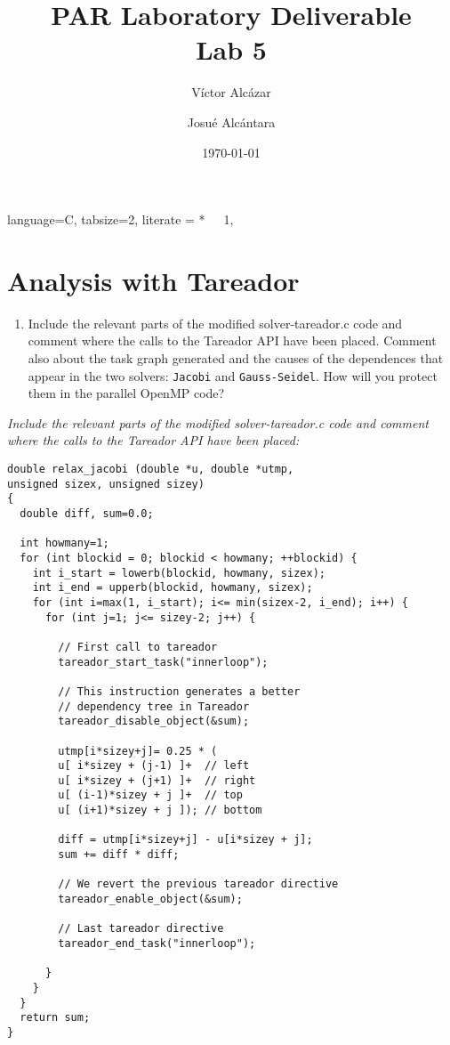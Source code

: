 \documentclass{report}
\author{Víctor Alcázar \and Josué Alcántara}
\title{PAR Laboratory Deliverable \\ Lab 5}
\date{\today}
\begin{document}
{
    language=C,
    tabsize=2,
    literate = *{\ \ }{\ }1,
}

\maketitle

\tableofcontents{}

\chapter{Analysis with Tareador}

\begin{enumerate}
  \item  Include the relevant parts of the modified solver-tareador.c code and comment where the calls to the Tareador API have been placed. Comment also about the task graph generated and the causes of the dependences that appear in the two solvers: \texttt{Jacobi} and \texttt{Gauss-Seidel}. How will you protect them in the parallel OpenMP code?
\end{enumerate}
\vspace{1cm}

\emph{Include the relevant parts of the modified solver-tareador.c code and comment where the calls to the Tareador API have been placed:}

\begin{lstlisting}[style=C2]
double relax_jacobi (double *u, double *utmp,
unsigned sizex, unsigned sizey)
{
  double diff, sum=0.0;

  int howmany=1;
  for (int blockid = 0; blockid < howmany; ++blockid) {
    int i_start = lowerb(blockid, howmany, sizex);
    int i_end = upperb(blockid, howmany, sizex);
    for (int i=max(1, i_start); i<= min(sizex-2, i_end); i++) {
      for (int j=1; j<= sizey-2; j++) {

        // First call to tareador
        tareador_start_task("innerloop");

        // This instruction generates a better
        // dependency tree in Tareador
        tareador_disable_object(&sum);

        utmp[i*sizey+j]= 0.25 * (
        u[ i*sizey + (j-1) ]+  // left
        u[ i*sizey + (j+1) ]+  // right
        u[ (i-1)*sizey + j ]+  // top
        u[ (i+1)*sizey + j ]); // bottom

        diff = utmp[i*sizey+j] - u[i*sizey + j];
        sum += diff * diff;

        // We revert the previous tareador directive
        tareador_enable_object(&sum);

        // Last tareador directive
        tareador_end_task("innerloop");

      }
    }
  }
  return sum;
}
\end{lstlisting}
\end{document}
